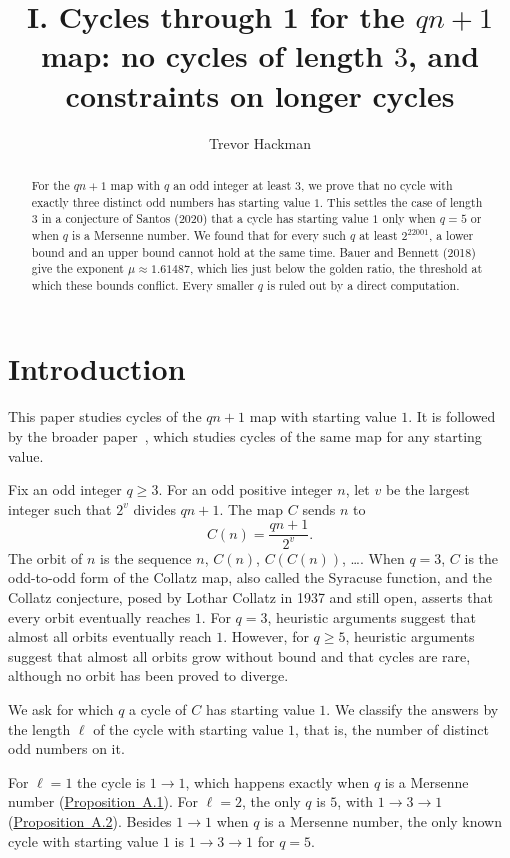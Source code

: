 \documentclass[11pt]{article}
\title{I. Cycles through 1 for the $qn+1$ map: no cycles of length $3$, and constraints on longer cycles}
\author{Trevor Hackman}
\date{}
\begin{document}
\maketitle

\begin{abstract}
\noindent
For the $qn+1$ map with $q$ an odd integer at least $3$, we prove that no cycle with exactly three distinct odd numbers has starting value $1$.
This settles the case of length $3$ in a conjecture of Santos (2020) that a cycle has starting value $1$ only when $q = 5$ or when $q$ is a Mersenne number.
We found that for every such $q$ at least $2^{22001}$, a lower bound and an upper bound cannot hold at the same time.
Bauer and Bennett (2018) give the exponent $\mu \approx 1.61487$, which lies just below the golden ratio, the threshold at which these bounds conflict.
Every smaller $q$ is ruled out by a direct computation.
\end{abstract}

\begingroup
\setlength{\parskip}{0pt}
\small
\tableofcontents
\endgroup

\section{Introduction}
\label{sec:introduction}

This paper studies cycles of the $qn+1$ map with starting value $1$.
It is followed by the broader paper~\cite{hackman-ii}, which studies cycles of the same map for any starting value.

Fix an odd integer $q \ge 3$.
For an odd positive integer $n$, let $v$ be the largest integer such that $2^v$ divides $qn+1$.
The map $C$ sends $n$ to
\[
C(n) = \frac{qn+1}{2^v}.
\]
The orbit of $n$ is the sequence $n$, $C(n)$, $C(C(n))$, \ldots.
When $q = 3$, $C$ is the odd-to-odd form of the Collatz map, also called the Syracuse function, and the Collatz conjecture, posed by Lothar Collatz in 1937 and still open, asserts that every orbit eventually reaches $1$.
For $q = 3$, heuristic arguments suggest that almost all orbits eventually reach $1$.
However, for $q \ge 5$, heuristic arguments suggest that almost all orbits grow without bound and that cycles are rare, although no orbit has been proved to diverge.

We ask for which $q$ a cycle of $C$ has starting value $1$.
We classify the answers by the length $\ell$ of the cycle with starting value $1$, that is, the number of distinct odd numbers on it.

For $\ell = 1$ the cycle is $1 \to 1$, which happens exactly when $q$ is a Mersenne number (\hyperref[prop:a1]{Proposition~A.1}).
For $\ell = 2$, the only $q$ is $5$, with $1 \to 3 \to 1$ (\hyperref[prop:a2]{Proposition~A.2}).
Besides $1 \to 1$ when $q$ is a Mersenne number, the only known cycle with starting value $1$ is $1 \to 3 \to 1$ for $q = 5$.
\end{document}
